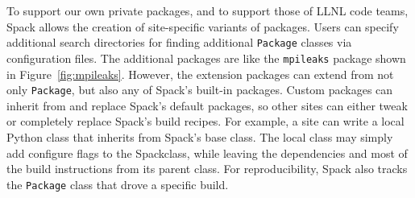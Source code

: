 To support our own private packages, and to support those of LLNL code teams,
Spack allows the creation of site-specific variants of packages.
Users can specify additional search directories for finding additional 
{\tt Package} classes via configuration files.
%
The additional packages are like the {\tt mpileaks} package shown in 
Figure~\ref{fig:mpileaks}.  However, the extension packages can extend from not
only {\tt Package}, but also any of Spack's built-in packages.
Custom packages can inherit from and replace Spack's default
packages, so other sites can either tweak or completely replace Spack's
build recipes. For example, a site can write a local Python class that 
inherits from Spack's base class. The local class may simply add configure 
flags to the Spackclass, while leaving the dependencies and most of the 
build instructions from its parent class. For reproducibility, Spack also 
tracks the {\tt Package} class that drove a specific build.
